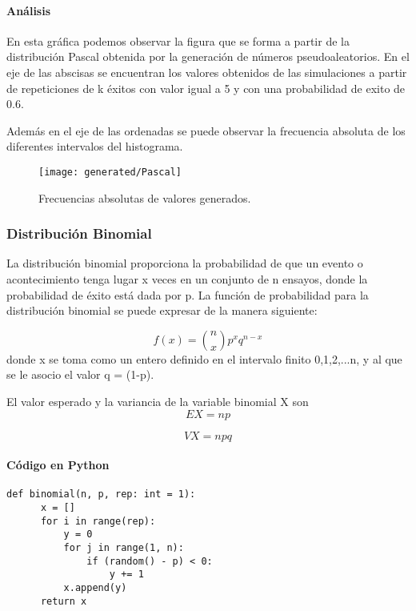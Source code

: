 \documentclass{article}
\begin{document}
  \paragraph{Análisis\newline}
  En esta gráfica podemos observar la figura que se forma a partir de la distribución Pascal obtenida por
  la generación de números pseudoaleatorios. En el eje de las abscisas se encuentran los valores obtenidos de las simulaciones
  a partir de repeticiones de k éxitos con valor igual a 5 y con una probabilidad de exito de 0.6.

  Además en el eje de las ordenadas se puede observar la frecuencia absoluta de los diferentes intervalos del histograma.
  \begin{figure}[h]
    \centering
    \texttt{[image: generated/Pascal]}
    \caption{Frecuencias absolutas de valores generados.}
  \end{figure}










  \subsubsection{Distribución Binomial}
  La distribución binomial proporciona la probabilidad de que un evento o acontecimiento tenga lugar x veces en un conjunto de n ensayos,
  donde la probabilidad de éxito está dada por p. La función de probabilidad para la distribución binomial se puede expresar de la manera siguiente:

  \begin{equation}
    f(x) = \binom{n}{x} p^{x}q^{n-x}
  \end{equation}
  donde x se toma como un entero definido en el intervalo finito 0,1,2,...n, y al que se le asocio el valor q = (1-p).

  El valor esperado y la variancia de la variable binomial X son
  \begin{equation}
    EX = np
  \end{equation}

  \begin{equation}
  VX = npq
  \end{equation}

  \paragraph{Código en Python}
  \begin{lstlisting}[style = Python]
   def binomial(n, p, rep: int = 1):
      x = []
      for i in range(rep):
          y = 0
          for j in range(1, n):
              if (random() - p) < 0:
                  y += 1
          x.append(y)
      return x
  \end{lstlisting}
\end{document}
